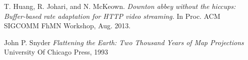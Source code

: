 \documentclass[9pt,a4paper]{acmproc}
\begin{document}
\begin{thebibliography}{9}
T. Huang, R. Johari, and N. McKeown.
	\emph{ Downton abbey without the hiccups: Buffer-based rate adaptation for HTTP video streaming.}
	\newline
	 In Proc. ACM SIGCOMM FhMN
Workshop, Aug. 2013.

John P. Snyder
	\emph{Flattening the Earth: Two Thousand Years of Map Projections}
	\newline
	University Of Chicago Press, 1993





\end{thebibliography}

\thispagestyle{empty}
\end{document}
